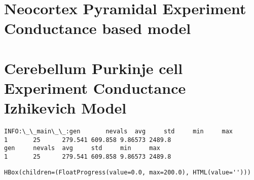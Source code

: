     \hypertarget{neocortex-pyramidal-experiment-conductance-based-model}{%
\section{Neocortex Pyramidal Experiment Conductance based
model}\label{neocortex-pyramidal-experiment-conductance-based-model}}

    \hypertarget{cerebellum-purkinje-cell-experiment-conductance-izhikevich-model}{%
\section{Cerebellum Purkinje cell Experiment Conductance Izhikevich
Model}\label{cerebellum-purkinje-cell-experiment-conductance-izhikevich-model}}

    \begin{Verbatim}[commandchars=\\\{\}]
INFO:\_\_main\_\_:gen       nevals  avg     std     min     max
1       25      279.541 609.858 9.86573 2489.8
gen     nevals  avg     std     min     max
1       25      279.541 609.858 9.86573 2489.8
    \end{Verbatim}

    
    \begin{verbatim}
HBox(children=(FloatProgress(value=0.0, max=200.0), HTML(value='')))
    \end{verbatim}

